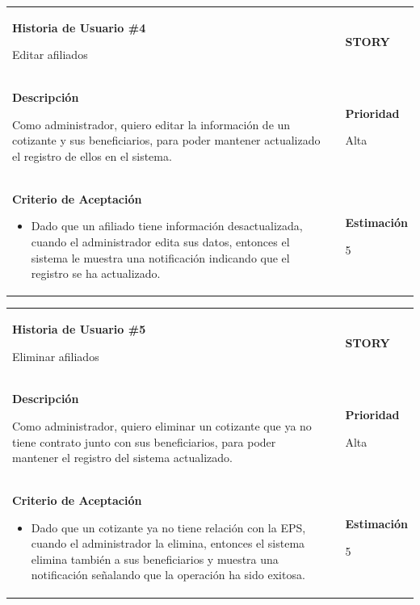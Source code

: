 \documentclass[12pt,a4paper]{article}
\begin{document}
\begin{center}
\begin{tabular}{| p{10cm} c p{2.5cm}|}
\hline 
\textbf{Historia de Usuario \#4}

Editar afiliados & & \textbf{{\Large STORY}} \\ 
\textbf{Descripción}

Como administrador, quiero editar la información de un cotizante y sus
beneficiarios, para poder mantener actualizado el registro de ellos en el
sistema. &  & \textbf{Prioridad}

Alta\\

\textbf{Criterio de Aceptación}

\begin{itemize}
\item Dado que un afiliado tiene información desactualizada, cuando el
administrador edita sus datos, entonces el sistema le muestra
una notificación indicando que el registro se ha actualizado.
\end{itemize} & & \textbf{Estimación}

5 \\ 
\hline 
\end{tabular}
\vspace{5mm}

\begin{tabular}{| p{10cm} c p{2.5cm}|}
\hline 
\textbf{Historia de Usuario \#5}

Eliminar afiliados & & \textbf{{\Large STORY}} \\ 
\textbf{Descripción}

Como administrador, quiero eliminar un cotizante que ya no tiene
contrato junto con sus beneficiarios, para poder mantener el registro del
sistema actualizado. &  & \textbf{Prioridad}

Alta\\

\textbf{Criterio de Aceptación}

\begin{itemize}
\item Dado que un cotizante ya no tiene relación con la EPS, cuando el
administrador la elimina, entonces el sistema elimina también a
sus beneficiarios y muestra una notificación señalando que la
operación ha sido exitosa.
\end{itemize} & & \textbf{Estimación}

5 \\ 
\hline 
\end{tabular}
\vspace{5mm}


\end{center}
\end{document}
